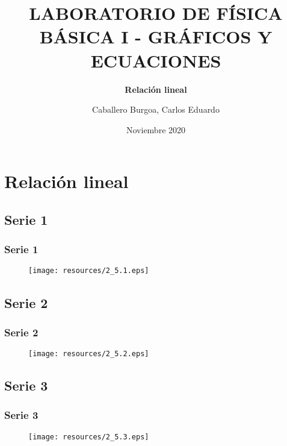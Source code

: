 \documentclass[letter,11pt]{beamer}
\title{\textbf{LABORATORIO DE FÍSICA BÁSICA I - GRÁFICOS Y ECUACIONES}}
\subtitle{\textbf{Relación lineal}}
\author{\small{Caballero Burgoa, Carlos Eduardo}}
\date{\tiny{Noviembre 2020}}
\begin{document}
\begin{frame}
\titlepage
\end{frame}

\section{Relación lineal}

\subsection{Serie 1}
\begin{frame}
\frametitle{Serie 1}
    \begin{figure}[!h]
        \centering
        \texttt{[image: resources/2\_5.1.eps]}
    \end{figure}
\end{frame}

\subsection{Serie 2}
\begin{frame}
\frametitle{Serie 2}
    \begin{figure}[!h]
        \centering
        \texttt{[image: resources/2\_5.2.eps]}
    \end{figure}
\end{frame}

\subsection{Serie 3}
\begin{frame}
\frametitle{Serie 3}
    \begin{figure}[!h]
        \centering
        \texttt{[image: resources/2\_5.3.eps]}
    \end{figure}
\end{frame}
\end{document}

